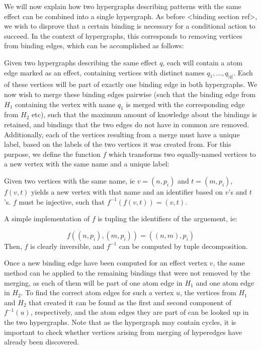 \documentclass[../Master.tex]{subfiles}
\begin{document}
We will now explain how two hypergraphs describing patterns with the same effect can be combined into a single hypergraph. As before <binding section ref>, we wish to disprove that a certain binding is necessary for a conditional action to succeed. In the context of hypergraphs, this corresponds to removing vertices from binding edges, which can be accomplished as follows:

Given two hypergraphs describing the same effect $q$, each will contain a atom edge marked as an effect, containing vertices with distinct names $q_1, \ldots, q_{|q|}$. Each of these vertices will be part of exactly one binding edge in both hypergraphs. We now wish to merge these binding edges pairwise (such that the binding edge from $H_1$ containing the vertex with name $q_1$ is merged with the corresponding edge from $H_2$ etc), such that the maximum amount of knowledge about the bindings is retained, and bindings that the two edges do not have in common are removed. Additionally, each of the vertices resulting from a merge must have a unique label, based on the labels of the two vertices it was created from. For this purpose, we define the function $f$ which transforms two equally-named vertices to a new vertex with the same name and a unique label:

\begin{definition}
    Given two vertices with the same name, ie $v = \left(n, p_i \right)$ and $t = \left( m, p_i \right)$, $f(v,t)$ yields a new vertex with that name and an identifier based on $v$'s and $t$'s. $f$ must be injective, such that $f^{-1}(f(v,t)) = (v,t)$.
\end{definition}

A simple implementation of $f$ is tupling the identifiers of the arguement, ie:

\begin{equation*}
   f\left( \left(n, p_i \right), \left(m, p_i \right) \right) =
       \left( (n,m), p_i \right)
\end{equation*}
Then, $f$ is clearly inversible, and $f^{-1}$ can be computed by tuple decomposition.

Once a new binding edge have been computed for an effect vertex $v$, the same method can be applied to the remaining bindings that were not removed by the merging, as each of them will be part of one atom edge in $H_1$ and one atom edge in $H_2$. To find the correct atom edges for such a vertex $u$, the vertices from $H_1$ and $H_2$ that created it can be found as the first and second component of $f^{-1}(u)$, respectively, and the atom edges they are part of can be looked up in the two hypergraphs. Note that as the hypergraph may contain cycles, it is important to check whether vertices arising from merging of hyperedges have already been discovered.
\end{document}
